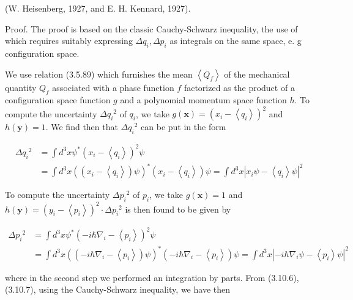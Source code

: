 \documentclass{article}
\begin{document}
(W. Heisenberg, 1927, and E. H. Kennard, 1927).

Proof. The proof is based on the classic Cauchy-Schwarz inequality, the use of which requires suitably expressing $\Delta q_{i}, \Delta p_{i}$ as integrals on the same space, e. g configuration space.

We use relation (3.5.89) which furnishes the mean $\left\langle Q_{f}\right\rangle$ of the mechanical quantity $Q_{f}$ associated with a phase function $f$ factorized as the product of a configuration space function $g$ and a polynomial momentum space function $h$. To compute the uncertainty $\Delta q_{i}{ }^{2}$ of $q_{i}$, we take $g(\boldsymbol{x})=\left(x_{i}-\left\langle q_{i}\right\rangle\right)^{2}$ and $h(\boldsymbol{y})=1$. We find then that $\Delta q_{i}{ }^{2}$ can be put in the form
 
\begin{align*}
\Delta q_{i}{ }^{2} & =\int d^{3} x \psi^{*}\left(x_{i}-\left\langle q_{i}\right\rangle\right)^{2} \psi  \tag{3.10.6}\\
& =\int d^{3} x\left(\left(x_{i}-\left\langle q_{i}\right\rangle\right) \psi\right)^{*}\left(x_{i}-\left\langle q_{i}\right\rangle\right) \psi=\int d^{3} x\left|x_{i} \psi-\left\langle q_{i}\right\rangle \psi\right|^{2}
\end{align*}
 

To compute the uncertainty $\Delta p_{i}{ }^{2}$ of $p_{i}$, we take $g(\boldsymbol{x})=1$ and $h(\boldsymbol{y})=\left(y_{i}-\left\langle p_{i}\right\rangle\right)^{2} \cdot \Delta p_{i}{ }^{2}$ is then found to be given by
 
\begin{align*}
\Delta p_{i}{ }^{2} & =\int d^{3} x \psi^{*}\left(-i \hbar \nabla_{i}-\left\langle p_{i}\right\rangle\right)^{2} \psi  \tag{3.10.7}\\
& =\int d^{3} x\left(\left(-i \hbar \nabla_{i}-\left\langle p_{i}\right\rangle\right) \psi\right)^{*}\left(-i \hbar \nabla_{i}-\left\langle p_{i}\right\rangle\right) \psi=\int d^{3} x\left|-i \hbar \nabla_{i} \psi-\left\langle p_{i}\right\rangle \psi\right|^{2}
\end{align*}
 
where in the second step we performed an integration by parts. From (3.10.6), (3.10.7), using the Cauchy-Schwarz inequality, we have then
 
\end{document}
